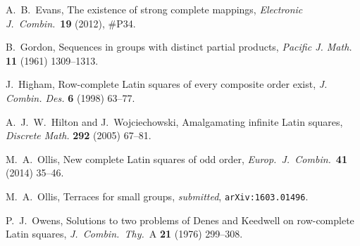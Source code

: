 \documentclass[12pt,a4paper]{article}
\begin{document}
\begin{thebibliography}{99}
A.~B.~Evans, The existence of strong complete mappings, {\em Electronic J.~Combin.}~{\bf 19} (2012), \#P34.



 B.~Gordon, Sequences in groups with distinct partial products, {\em Pacific J. Math.} {\bf 11} (1961) 1309--1313.

J.~Higham, Row-complete Latin squares of every composite order exist, {\em J. Combin. Des.} {\bf 6} (1998) 63--77. 

A.~J.~W.~Hilton and J.~Wojciechowski, Amalgamating infinite Latin squares, {\em Discrete Math.} {\bf 292} (2005) 67--81.







M.~A.~Ollis, New complete Latin squares of odd order, {\em Europ.~J.~Combin.}~{\bf 41} (2014) 35--46.

M.~A.~Ollis, Terraces for small groups, {\em submitted}, \texttt{arXiv:1603.01496}.

P.~J.~Owens,  Solutions to two problems of Denes and Keedwell on row-complete
Latin squares, {\em J.~Combin.~Thy.}~A {\bf 21} (1976) 299--308.


\end{thebibliography}
\end{document}

